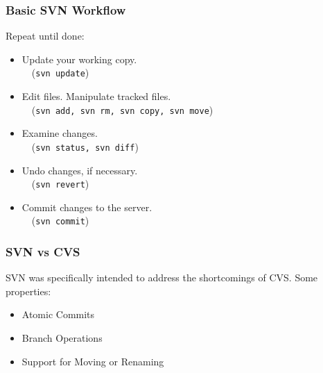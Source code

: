 \begin{frame}
\frametitle{Basic SVN Workflow}

\begin{changemargin}{1cm}
Repeat until done:
\begin{itemize}
\item Update your working copy.\\ ~~({\tt svn update})
\item Edit files. Manipulate tracked files.\\ ~~({\tt svn add, svn rm, svn copy, svn move})
\item Examine changes.\\~~({\tt svn status, svn diff})
\item Undo changes, if necessary.\\~~({\tt svn revert})
\item Commit changes to the server.\\~~({\tt svn commit})
\end{itemize}
\end{changemargin}

\end{frame}

\begin{frame}
\frametitle{SVN vs CVS}
\begin{changemargin}{1cm}
SVN was specifically intended to address the shortcomings of CVS. Some properties:
\begin{itemize}
	\item Atomic Commits 
	\item Branch Operations 
	\item Support for Moving or Renaming 
\end{itemize}
\end{changemargin}
\end{frame}

